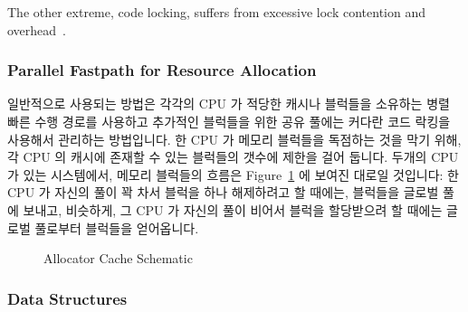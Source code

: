 The other extreme, code locking, suffers from excessive lock contention
and overhead~\cite{McKenney93}.
\fi

\subsubsection{Parallel Fastpath for Resource Allocation}

일반적으로 사용되는 방법은 각각의 CPU 가 적당한 캐시나 블럭들을 소유하는 병렬
빠른 수행 경로를 사용하고 추가적인 블럭들을 위한 공유 풀에는 커다란 코드 락킹을
사용해서 관리하는 방법입니다.
한 CPU 가 메모리 블럭들을 독점하는 것을 막기 위해, 각 CPU 의 캐시에 존재할 수
있는 블럭들의 갯수에 제한을 걸어 둡니다.
두개의 CPU 가 있는 시스템에서, 메모리 블럭들의 흐름은
Figure~\ref{fig:SMPdesign:Allocator Cache Schematic} 에 보여진 대로일 것입니다:
한 CPU 가 자신의 풀이 꽉 차서 블럭을 하나 해제하려고 할 때에는, 블럭들을 글로벌
풀에 보내고, 비슷하게, 그 CPU 가 자신의 풀이 비어서 블럭을 할당받으려 할 때에는
글로벌 풀로부터 블럭들을 얻어옵니다.

\begin{figure}[tbp]
\centering
{}
\caption{Allocator Cache Schematic}
\label{fig:SMPdesign:Allocator Cache Schematic}
\end{figure}

\subsubsection{Data Structures}

